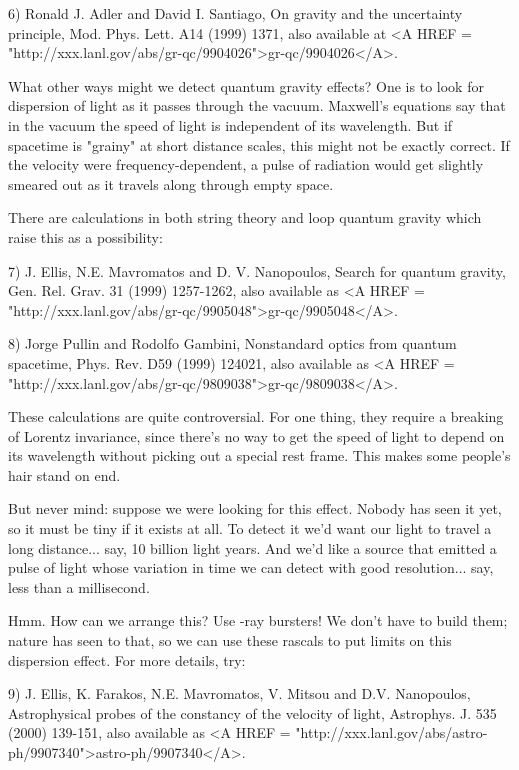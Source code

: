 6) Ronald J. Adler and David I. Santiago, On gravity and the uncertainty
principle, Mod. Phys. Lett. A14 (1999) 1371, also available at
<A HREF = "http://xxx.lanl.gov/abs/gr-qc/9904026">gr-qc/9904026</A>.    
  
What other ways might we detect quantum gravity effects?  One is to
look for dispersion of light as it passes through the vacuum.
Maxwell's equations say that in the vacuum the speed of light is
independent of its wavelength.  But if spacetime is "grainy" at short
distance scales, this might not be exactly correct.  If the velocity
were frequency-dependent, a pulse of radiation would get slightly
smeared out as it travels along through empty space.

There are calculations in both string theory and loop quantum gravity
which raise this as a possibility: 

7) J. Ellis, N.E. Mavromatos and D. V. Nanopoulos,
Search for quantum gravity, Gen. Rel. Grav. 31 (1999) 1257-1262,
also available as <A HREF = "http://xxx.lanl.gov/abs/gr-qc/9905048">gr-qc/9905048</A>.

8) Jorge Pullin and Rodolfo Gambini, Nonstandard optics from quantum
spacetime, Phys. Rev. D59 (1999) 124021, also available as <A HREF = "http://xxx.lanl.gov/abs/gr-qc/9809038">gr-qc/9809038</A>. 
  
These calculations are quite controversial.  For one thing, they
require a breaking of Lorentz invariance, since there's no way to get
the speed of light to depend on its wavelength without picking out a
special rest frame.  This makes some people's hair stand on end.

But never mind: suppose we were looking for this effect.  Nobody has
seen it yet, so it must be tiny if it exists at all.  To detect it
we'd want our light to travel a long distance... say, 10 billion light
years.  And we'd like a source that emitted a pulse of light whose
variation in time we can detect with good resolution... say, less than
a millisecond.

Hmm.  How can we arrange this?  Use \gamma -ray bursters!  We don't have
to build them; nature has seen to that, so we can use these rascals to
put limits on this dispersion effect.  For more details, try:

9) J. Ellis, K. Farakos, N.E. Mavromatos, V. Mitsou and D.V. Nanopoulos,
Astrophysical probes of the constancy of the velocity of light,
Astrophys. J. 535 (2000) 139-151, also available as <A HREF = "http://xxx.lanl.gov/abs/astro-ph/9907340">astro-ph/9907340</A>.  

